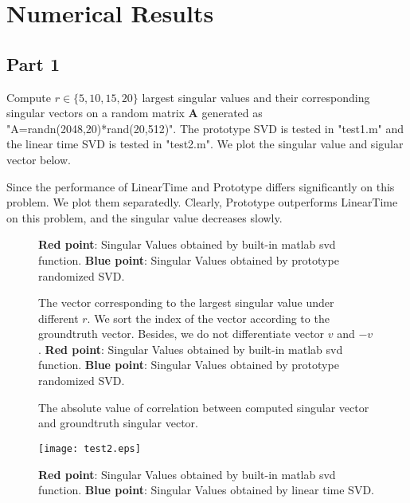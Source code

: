 \documentclass[conference,onecolumn,12pt]{IEEEtran}
\numberwithin{equation}{section}
\numberwithin{figure}{section}
\numberwithin{table}{section}
\theoremstyle{definition}
\begin{document}
\newpage
\section{Numerical Results}
\subsection{Part 1}
Compute $r \in \{5, 10, 15, 20\}$ largest singular values and their corresponding singular vectors on a random matrix $\mathbf{A}$ generated as "A=randn(2048,20)*rand(20,512)". The prototype SVD is tested in "test1.m" and the linear time SVD is tested in "test2.m". We plot the singular value and sigular vector below.

Since the performance of LinearTime and Prototype differs significantly on this problem. We plot them separatedly. Clearly, Prototype outperforms LinearTime on this problem, and the singular value decreases slowly.

\begin{figure}[htbp]
  \centering
  \resizebox{!}{0.4\textheight}{
}
\caption{{\bf Red point}: Singular Values obtained by built-in matlab svd function. {\bf Blue point}: Singular Values obtained by prototype randomized SVD.}
\label{fig: test1}
\end{figure}

\begin{figure}[htbp]
  \centering
  \resizebox{!}{0.4\textheight}{
}
\caption{The vector corresponding to the largest singular value under different $r$. We sort the index of the vector according to the groundtruth vector. Besides, we do not differentiate vector $v$ and $-v$. {\bf Red point}: Singular Values obtained by built-in matlab svd function. {\bf Blue point}: Singular Values obtained by prototype randomized SVD.}
\label{fig: test11}
\end{figure}

\begin{figure}[htbp]
  \centering
  \resizebox{!}{0.4\textheight}{
}
\caption{The absolute value of correlation between computed singular vector and groundtruth singular vector.}
\label{fig: test12}
\end{figure}

\begin{figure}[htbp]
  \centering
  \texttt{[image: test2.eps]}
\caption{{\bf Red point}: Singular Values obtained by built-in matlab svd function. {\bf Blue point}: Singular Values obtained by linear time SVD.}
\end{figure}
\end{document}
